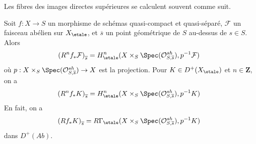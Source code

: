 \noindent
Les fibres des images directes sup\'erieures se calculent souvent comme suit.

\begin{theorem}
\label{theorem-higher-direct-images}
Soit $f: X \to S$ un morphisme de sch\'emas quasi-compact et quasi-s\'epar\'e,
$\mathcal{F}$ un faisceau ab\'elien sur $X_\etale$, et $\overline{s}$ un
point g\'eom\'etrique de $S$ au-dessus de $s \in S$. Alors
$$
\left(R^nf_* \mathcal{F}\right)_{\overline{s}} =
H_\etale^n( X \times_S \Spec(\mathcal{O}_{S, \overline{s}}^{sh}),
p^{-1}\mathcal{F})
$$
o\`u $p : X \times_S \Spec(\mathcal{O}_{S, \overline{s}}^{sh}) \to X$
est la projection. Pour $K \in D^+(X_\etale)$ et $n \in \mathbf{Z}$,
on a
$$
\left(R^nf_*K\right)_{\overline{s}} =
H_\etale^n(X \times_S \Spec(\mathcal{O}_{S, \overline{s}}^{sh}), p^{-1}K)
$$
En fait, on a
$$
\left(Rf_*K\right)_{\overline{s}}
=
R\Gamma_\etale(X \times_S \Spec(\mathcal{O}_{S, \overline{s}}^{sh}), p^{-1}K)
$$
dans $D^+(\textit{Ab})$.
\end{theorem}

